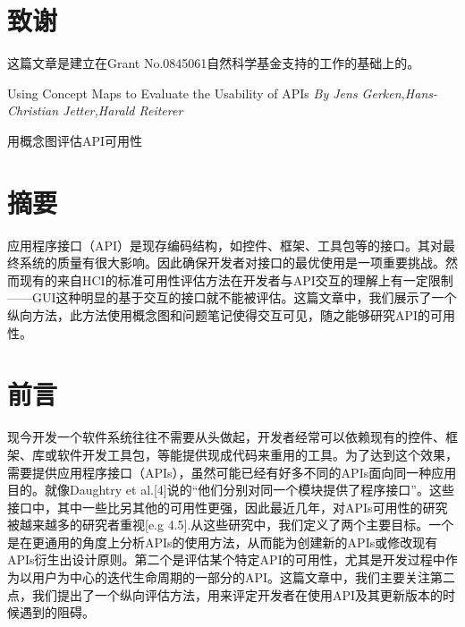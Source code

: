 \section*{致谢}
这篇文章是建立在Grant No.0845061自然科学基金支持的工作的基础上的。



\newpage
\pagestyle{empty}

\begin{center}
{\heiti{}Using Concept Maps to Evaluate the Usability of APIs}
\textsl{By Jens Gerken,Hans-Christian Jetter,Harald Reiterer }

{\heiti{} 用概念图评估API可用性}
\end{center}


\section*{摘要}
应用程序接口（API）是现存编码结构，如控件、框架、工具包等的接口。其对最终系统的质量有很大影响。因此确保开发者对接口的最优使用是一项重要挑战。然而现有的来自HCI的标准可用性评估方法在开发者与API交互的理解上有一定限制——GUI这种明显的基于交互的接口就不能被评估。这篇文章中，我们展示了一个纵向方法，此方法使用概念图和问题笔记使得交互可见，随之能够研究API的可用性。

\section*{前言}
现今开发一个软件系统往往不需要从头做起，开发者经常可以依赖现有的控件、框架、库或软件开发工具包，等能提供现成代码来重用的工具。为了达到这个效果，需要提供应用程序接口（APIs），虽然可能已经有好多不同的APIs面向同一种应用目的。就像Daughtry et al.[4]说的“他们分别对同一个模块提供了程序接口”。这些接口中，其中一些比另其他的可用性更强，因此最近几年，对APIs可用性的研究被越来越多的研究者重视[e.g 4.5].从这些研究中，我们定义了两个主要目标。一个是在更通用的角度上分析APIs的使用方法，从而能为创建新的APIs或修改现有APIs衍生出设计原则。第二个是评估某个特定API的可用性，尤其是开发过程中作为以用户为中心的迭代生命周期的一部分的API。这篇文章中，我们主要关注第二点，我们提出了一个纵向评估方法，用来评定开发者在使用API及其更新版本的时候遇到的阻碍。
